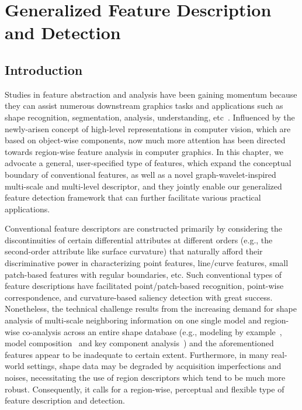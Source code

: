 \chapter{Generalized Feature Description and Detection}

\section{Introduction}

Studies in feature abstraction and analysis have been gaining momentum because
they can assist numerous downstream graphics tasks and applications such as shape
recognition, segmentation, analysis, understanding, etc~\cite{Bronstein:2011:PAMI,Kin-ChungAu:2012,Song:2014:MSV}.
Influenced by the newly-arisen concept of high-level representations
in computer vision, which are based on object-wise components, now
much more attention has been directed towards region-wise feature
analysis in computer graphics. In this chapter, we advocate a general,
user-specified type of features, which expand the conceptual boundary
of conventional features, as well as a novel graph-wavelet-inspired
multi-scale and multi-level descriptor, and they jointly enable our
generalized feature detection framework that can further facilitate
various practical applications.

Conventional feature descriptors are constructed primarily by
considering the discontinuities of certain differential attributes at
different orders (e.g., the second-order attribute like surface
curvature) that naturally afford their discriminative power in
characterizing point features, line/curve features, small patch-based
features with regular boundaries, etc. Such conventional types of
feature descriptions have facilitated point/patch-based recognition,
point-wise correspondence, and curvature-based saliency detection with
great success. Nonetheless, the technical challenge
results from the increasing demand for shape analysis of multi-scale
neighboring information on one single model and region-wise
co-analysis across an entire shape database (e.g., modeling by
example~\cite{Funkhouser:2004}, model
composition~\cite{Kreavoy:2007} and key component
analysis~\cite{Sipiran:2012}) and the aforementioned features appear
to be inadequate to certain extent. Furthermore, in many
real-world settings, shape data may be degraded by acquisition
imperfections and noises, necessitating the use of region descriptors
which tend to be much more robust. Consequently, it calls for a
region-wise, perceptual and flexible type of feature description and
detection.

